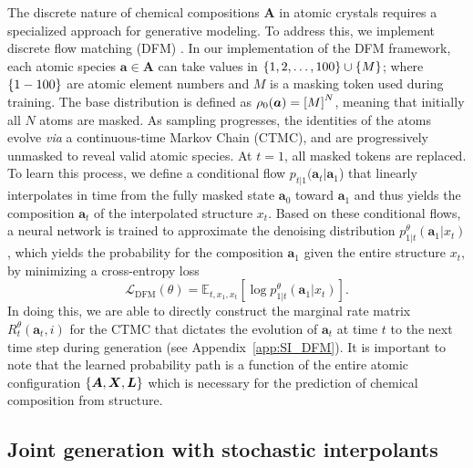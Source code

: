 The discrete nature of chemical compositions $\bm{A}$ in atomic crystals requires a specialized approach for generative modeling. To address this, we implement discrete flow matching (DFM) \citep{campbell_generative_2024}.
In our implementation of the DFM framework, each atomic species $\bm{a} \in \bm{A}$ can take values in $\left\{ 1,2,\dots,100 \right\} \cup \left\{ M \right\}$; where $\left\{ 1-100 \right\}$ are atomic element numbers and $M$ is a masking token used during training.
The base distribution is defined as $\rho_0(\bm{a}) = \left[ M \right]^N$, meaning that initially all $N$ atoms are masked. As sampling progresses, the identities of the atoms evolve \emph{via} a continuous-time Markov Chain (CTMC), and are progressively unmasked to reveal valid atomic species. At $t=1$, all masked tokens are replaced.
To learn this process, we define a conditional flow $p_{t|1}(\bm{a}_t|\bm{a}_1$) that linearly interpolates in time from the fully masked state $\bm{a}_0$ toward $\bm{a}_1$ and thus yields the composition $\bm{a}_t$ of the interpolated structure $x_t$. Based on these conditional flows, a neural network is trained to approximate the denoising distribution $p_{1|t}^\theta(\bm{a}_1|x_t)$, which yields the probability for the composition $\bm{a}_1$ given the entire structure $x_t$, by minimizing a cross-entropy loss
\begin{equation}
    \mathcal{L}_{\mathrm{DFM}}(\theta) = \mathbb{E}_{t, x_{1}, x_{t}} \left[ \log p_{1|t}^\theta(\bm{a}_1|x_{t}) \right].
\label{eq:loss_dfm}
\end{equation}
In doing this, we are able to directly construct the marginal rate matrix $R^\theta_t(\bm{a}_t, i)$ for the CTMC that dictates the evolution of $\bm{a}_t$ at time $t$ to the next time step during generation (see Appendix~\ref{app:SI_DFM}). It is important to note that the learned probability path is a function of the entire atomic configuration $\left\{ \bm{A}, \bm{X}, \bm{L} \right\}$ which is necessary for the prediction of chemical composition from structure.


\subsection{Joint generation with stochastic interpolants}

